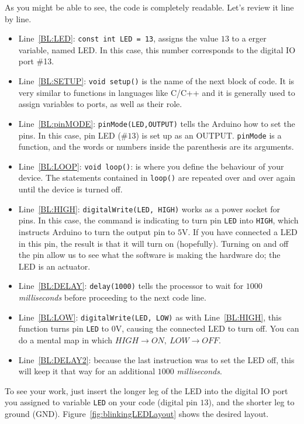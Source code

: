 As you might be able to see, the code is completely readable. Let's review it line by line.

\begin{itemize}
	\item Line~\ref{BL:LED}: \texttt{const int LED = 13}, assigns the value $13$ to a \texttt{\color{red}{int}}erger variable, named LED. In this case, this number corresponds to the digital IO port \#13.
	\item Line~\ref{BL:SETUP}: \texttt{void setup()} is the name of the next block of code. It is very similar to functions in languages like C/C++ and it is generally used to assign variables to ports, as well as their role.
	\item Line~\ref{BL:pinMODE}: \texttt{pinMode(LED,OUTPUT)} tells the Arduino how to set the pins. In this case, pin LED ($\#13$) is set up as an OUTPUT. \texttt{pinMode} is a function, and the words or numbers inside the parenthesis are its arguments.
	\item Line~\ref{BL:LOOP}: \texttt{void loop()}: is where you define the behaviour of your device. The statements contained in \texttt{loop()} are repeated over and over again until the device is turned off.
	\item Line~\ref{BL:HIGH}: \texttt{digitalWrite(LED, HIGH)} works as a power socket for pins. In this case, the command is indicating to turn pin \texttt{LED} into \texttt{HIGH}, which instructs Arduino to turn the output pin to $5$V. If you have connected a LED in this pin, the result is that it will turn on (hopefully). Turning on and off the pin allow us to see what the software is making the hardware do; the LED is an actuator.
	\item Line~\ref{BL:DELAY}: \texttt{delay(1000)} tells the processor to wait for $1000$ \emph{milliseconds} before proceeding to the next code line.
	\item Line~\ref{BL:LOW}: \texttt{digitalWrite(LED, LOW)} as with Line~\ref{BL:HIGH}, this function turns pin \texttt{LED} to $0$V, causing the connected LED to turn off. You can do a mental map in which $HIGH \rightarrow ON,\ LOW \rightarrow OFF$.
	\item Line~\ref{BL:DELAY2}: because the last instruction was to set the LED off, this will keep it that way for an additional $1000$ \emph{milliseconds}.
\end{itemize}

To see your work, just insert the longer leg of the LED into the digital IO port you assigned to variable \texttt{LED} on your code (digital pin $13$), and the shorter leg to ground (GND). Figure~\ref{fig:blinkingLEDLayout} shows the desired layout.

